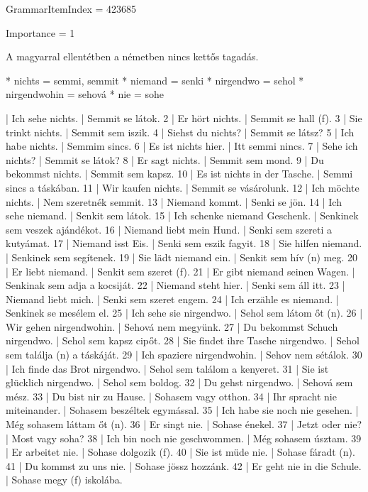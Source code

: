 \documentclass{article}
\newenvironment{desc}{\verbatim}{\endverbatim}
\newenvironment{exmp}{\verbatim}{\endverbatim}
\begin{document}
GrammarItemIndex = 423685

Importance = 1

\begin{desc}
A magyarral ellentétben a németben nincs kettős tagadás.

* nichts = semmi, semmit
* niemand = senki
* nirgendwo = sehol
* nirgendwohin = sehová
* nie = sohe
\end{desc}

\begin{exmp}
1 | Ich sehe nichts. | Semmit se látok.
2 | Er hört nichts. | Semmit se hall (f).
3 | Sie trinkt nichts. | Semmit sem iszik.
4 | Siehst du nichts? | Semmit se látsz?
5 | Ich habe nichts. | Semmim sincs.
6 | Es ist nichts hier. | Itt semmi nincs.
7 | Sehe ich nichts? | Semmit se látok?
8 | Er sagt nichts. | Semmit sem mond.
9 | Du bekommst nichts. | Semmit sem kapsz.
10 | Es ist nichts in der Tasche. | Semmi sincs a táskában.
11 | Wir kaufen nichts. | Semmit se vásárolunk.
12 | Ich möchte nichts. | Nem szeretnék semmit.
13 | Niemand kommt. | Senki se jön.
14 | Ich sehe niemand. | Senkit sem látok.
15 | Ich schenke niemand Geschenk. | Senkinek sem veszek ajándékot.
16 | Niemand liebt mein Hund. | Senki sem szereti a kutyámat.
17 | Niemand isst Eis. | Senki sem eszik fagyit.
18 | Sie hilfen niemand. | Senkinek sem segítenek.
19 | Sie lädt niemand ein. | Senkit sem hív (n) meg.
20 | Er liebt niemand. | Senkit sem szeret (f).
21 | Er gibt niemand seinen Wagen. | Senkinak sem adja a kocsiját.
22 | Niemand steht hier. | Senki sem áll itt.
23 | Niemand liebt mich. | Senki sem szeret engem.
24 | Ich erzähle es niemand. | Senkinek se mesélem el.
25 | Ich sehe sie nirgendwo. | Sehol sem látom őt (n).
26 | Wir gehen nirgendwohin. | Sehová nem megyünk.
27 | Du bekommst Schuch nirgendwo. | Sehol sem kapsz cipőt.
28 | Sie findet ihre Tasche nirgendwo. | Sehol sem találja (n) a táskáját.
29 | Ich spaziere nirgendwohin. | Sehov nem sétálok.
30 | Ich finde das Brot nirgendwo. | Sehol sem találom a kenyeret.
31 | Sie ist glücklich nirgendwo. | Sehol sem boldog.
32 | Du gehst nirgendwo. | Sehová sem mész.
33 | Du bist nir zu Hause. | Sohasem vagy otthon.
34 | Ihr spracht nie miteinander. | Sohasem beszéltek egymással.
35 | Ich habe sie noch nie gesehen. | Még sohasem láttam őt (n).
36 | Er singt nie. | Sohase énekel.
37 | Jetzt oder nie? | Most vagy soha?
38 | Ich bin noch nie geschwommen. | Még sohasem úsztam.
39 | Er arbeitet nie. | Sohase dolgozik (f).
40 | Sie ist müde nie. | Sohase fáradt (n).
41 | Du kommst zu uns nie. | Sohase jössz hozzánk.
42 | Er geht nie in die Schule. | Sohase megy (f) iskolába.
\end{exmp}
\end{document}
